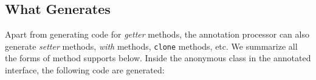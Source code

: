 \subsection{What  \mixin Generates}
Apart from generating code for \emph{getter} methods, the annotation processor
can also generate \emph{setter} methods, \emph{with} methods, \texttt{clone}
methods, etc. We summarize all the forms of method \mixin  supports below. Inside
the anonymous class in the annotated interface, the following code are
generated:


